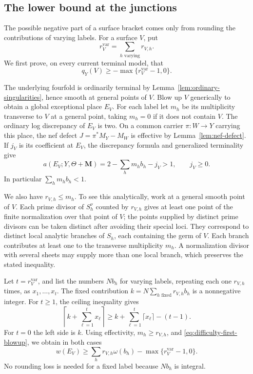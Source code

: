\documentclass[11pt]{amsart}
\theoremstyle{definition}
\theoremstyle{remark}
\numberwithin{equation}{section}
\newcommand{\M}{\mathbf{M}}
\begin{document}
\subsection{The lower bound at the junctions}

The possible negative part of a surface bracket comes only from rounding
the contributions of varying labels.  For a surface \(V\), put
\[
 r_V^{\mathrm{var}}=\sum_{h\text{ varying}}r_{V,h}.
\]
We first prove, on every current terminal model, that
\begin{equation}\label{eq:difficulty-local-bound}
 q_Y(V)\geq-\max\{r_V^{\mathrm{var}}-1,0\}.
\end{equation}

The underlying fourfold is ordinarily terminal by
Lemma~\ref{lem:ordinary-singularities}, hence smooth at general points of
\(V\).  Blow up \(V\) generically to obtain a global exceptional
place \(E_V\).  For each label let \(m_h\) be its multiplicity transverse
to \(V\) at a general point, taking \(m_h=0\) if it does not contain
\(V\).  The ordinary log discrepancy of \(E_V\) is two.  On a common
carrier \(\pi:W\to Y\) carrying this place, the nef defect
\(J=\pi^*M_Y-M_W\) is effective by Lemma~\ref{lem:nef-defect}.  If \(j_V\) is its coefficient at
\(E_V\), the discrepancy formula and generalized terminality give
\begin{equation}\label{eq:difficulty-first-blowup}
 a(E_V;Y,\Theta+\M)=2-\sum_hm_hb_h-j_V>1,
 \qquad j_V\geq0.
\end{equation}
In particular \(\sum_hm_hb_h<1\).

We also have \(r_{V,h}\leq m_h\).  To see this analytically, work at a
general smooth point of \(V\).  Each prime divisor of \(S_h^\nu\) counted
by \(r_{V,h}\) gives at least one point of the finite normalization over
that point of \(V\); the points supplied by distinct prime divisors can be
taken distinct after avoiding their special loci.  They correspond to
distinct local analytic branches of \(S_h\), each containing the germ of
\(V\).  Each branch contributes at least one to the transverse multiplicity
\(m_h\).  A normalization divisor with several sheets may supply more
than one local branch, which preserves the stated inequality.

Let \(t=r_V^{\mathrm{var}}\), and list the numbers \(Nb_h\) for varying
labels, repeating each one \(r_{V,h}\) times, as
\(x_1,\ldots,x_t\).  The fixed contribution
\(k=N\sum_{h\text{ fixed}}r_{V,h}b_h\) is a nonnegative integer.  For
\(t\geq1\), the ceiling inequality gives
\[
 \left\lceil k+\sum_{\ell=1}^t x_\ell\right\rceil
 \geq k+\sum_{\ell=1}^t\lceil x_\ell\rceil-(t-1).
\]
For \(t=0\) the left side is \(k\).  Using effectivity,
\(m_h\geq r_{V,h}\), and \eqref{eq:difficulty-first-blowup}, we obtain in
both cases
\begin{equation}\label{eq:difficulty-first-weight}
 w(E_V)\geq\sum_h r_{V,h}\omega(b_h)
              -\max\{r_V^{\mathrm{var}}-1,0\}.
\end{equation}
No rounding loss is needed for a fixed label because \(Nb_h\) is integral.
\end{document}
